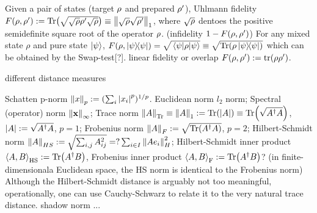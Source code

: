 \begin{definition}[fidelity]\label{def:fidelity}
	Given a pair of states (target $\rho$ and prepared $\rho'$), 
	Uhlmann fidelity $F(\rho,\rho') : = \Tr(\sqrt{\sqrt{\rho}\rho'\sqrt{\rho}})\equiv\norm{\sqrt{\rho}\sqrt{\rho'}}_1$, where $\sqrt{\rho}$ dentoes the positive semidefinite square root of the operator $\rho$. (infidelity $1-F(\rho,\rho')$)
	For any mixed state $\rho$ and pure state $\ket{\psi}$, $F(\rho,\op{\psi})=\sqrt{\mel{\psi}{\rho}{\psi}}\equiv \sqrt{\Tr(\rho\op{\psi})}$ which can be obtained by the Swap-test[?].
	linear fidelity or overlap $F(\rho,\rho'):=\tr(\rho\rho')$.
\end{definition}
different distance measures \cite{badescuQuantumStateCertification2017}
\begin{notation}[norm]\label{def:norm}
	Schatten p-norm $\norm{x}_p:= (\sum_i \abs{x_i}^p)^{1/p}$.
	Euclidean norm $l_2$ norm;
	Spectral (operator) norm $\norm{\vb{x}}_{\infty}$;
	Trace norm $\norm{A}_{\Tr}\equiv\norm{A}_{1}:=\Tr(\abs{A})\equiv\Tr(\sqrt{A^\dagger A})$, $\abs{A}:=\sqrt{A^\dagger A}$, $p=1$;
	Frobenius norm $\norm{A}_{F}:=\sqrt{\Tr(A^\dagger A)}$, $p=2$;
	Hilbert-Schmidt norm $\norm{A}_{HS}:=\sqrt{\sum_{i,j} A_{ij}^2 }=?\sum_{i\in I}\norm{Ae_i}_H^2$;
	Hilbert-Schmidt inner product $\expval{A,B}_{\textup{HS}}:=\Tr(A^\dagger B)$,
	Frobenius inner product $\expval{A,B}_{\textup{F}}:=\Tr(A^\dagger B)$?
	(in finite-dimensionala Euclidean space, the HS norm is identical to the Frobenius norm)
	Although the Hilbert-Schmidt distance is arguably not too meaningful, operationally, one can use Cauchy-Schwarz to relate it to the very natural trace distance. 
	shadow norm ...
\end{notation}
